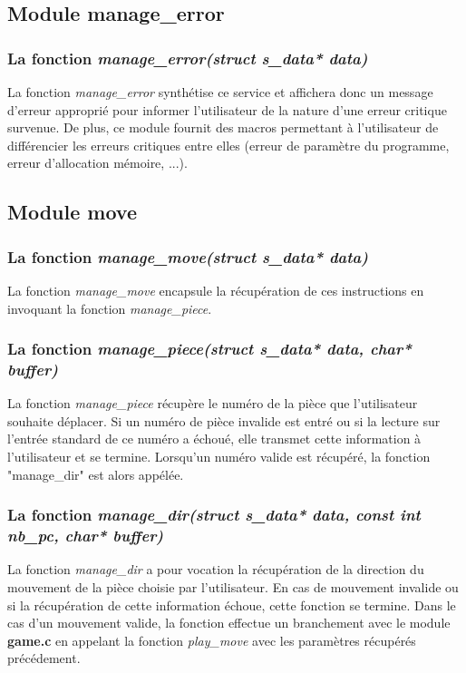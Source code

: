 \documentclass{report}
\begin{document}
\subsection{Module manage\_error}
\subsubsection{La fonction \textit{manage\_error(struct s\_data* data)}}
La fonction \textit{manage\_error} synthétise ce service et affichera donc un message d'erreur approprié pour informer l'utilisateur de la nature d'une erreur critique survenue.
De plus, ce module fournit des macros permettant à l'utilisateur de différencier les erreurs critiques entre elles (erreur de paramètre du programme, erreur d'allocation mémoire, ...).

\subsection{Module move}
\subsubsection*{La fonction \textit{manage\_move(struct s\_data* data)}}
La fonction \textit{manage\_move} encapsule la récupération de ces instructions en invoquant la fonction \textit{manage\_piece}.
\subsubsection*{La fonction \textit{manage\_piece(struct s\_data* data, char* buffer)}}
La fonction \textit{manage\_piece} récupère le numéro de la pièce que l'utilisateur souhaite déplacer.
Si un numéro de pièce invalide est entré ou si la lecture sur l'entrée standard de ce numéro a échoué, elle transmet cette information à l'utilisateur et se termine.
Lorsqu'un numéro valide est récupéré, la fonction "manage\_dir" est alors appélée.
\subsubsection*{La fonction \textit{manage\_dir(struct s\_data* data, const int nb\_pc, char* buffer)}}
La fonction \textit{manage\_dir} a pour vocation la récupération de la direction du mouvement de la pièce choisie par l'utilisateur.
En cas de mouvement invalide ou si la récupération de cette information échoue, cette fonction se termine.
Dans le cas d'un mouvement valide, la fonction effectue un branchement avec le module \textbf{game.c} en appelant la fonction \textit{play\_move} avec les paramètres récupérés précédement.
\end{document}
